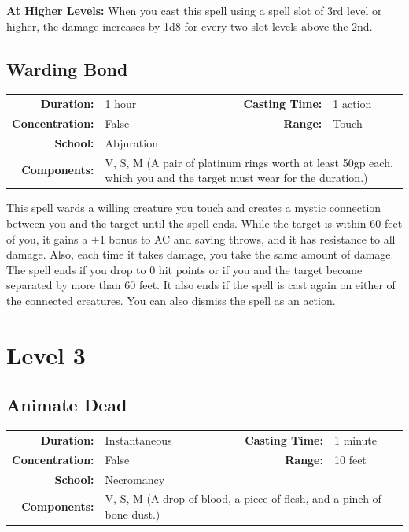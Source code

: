 \documentclass[12pt,showtrims]{memoir}
\begin{document}
\vspace{8pt} \noindent\textbf{At Higher Levels:} When you cast this spell using a spell slot of 3rd level or higher, the damage increases by 1d8 for every two slot levels above the 2nd.
\newpage
\section*{Warding Bond}

{
\small\centering\vspace{-6pt}
\begin{tabular}{rlrl}
\toprule

\textbf{Duration:} & 1 hour &
\textbf{Casting Time:} & 1 action \\
\textbf{Concentration:} & False &
\textbf{Range:} & Touch \\
\textbf{School:} & Abjuration \\
\textbf{Components:} & \multicolumn{3}{p{0.7\textwidth}}{V, S, M (A pair of platinum rings worth at least 50gp each, which you and the target must wear for the duration.)}\\

\bottomrule
\end{tabular}
}

\vspace{1\baselineskip}\noindent This spell wards a willing creature you touch and creates a mystic connection between you and the target until the spell ends. While the target is within 60 feet of you, it gains a +1 bonus to AC and saving throws, and it has resistance to all damage. Also, each time it takes damage, you take the same amount of damage. The spell ends if you drop to 0 hit points or if you and the target become separated by more than 60 feet. It also ends if the spell is cast again on either of the connected creatures. You can also dismiss the spell as an action.

\newpage
\chapter*{Level 3} 
\section*{Animate Dead}

{
\small\centering\vspace{-6pt}
\begin{tabular}{rlrl}
\toprule

\textbf{Duration:} & Instantaneous &
\textbf{Casting Time:} & 1 minute \\
\textbf{Concentration:} & False &
\textbf{Range:} & 10 feet \\
\textbf{School:} & Necromancy \\
\textbf{Components:} & \multicolumn{3}{p{0.7\textwidth}}{V, S, M (A drop of blood, a piece of flesh, and a pinch of bone dust.)}\\

\bottomrule
\end{tabular}
}
\end{document}
